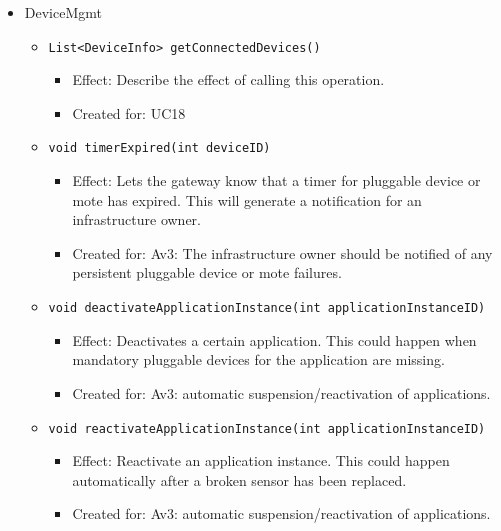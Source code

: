 \begin{itemize}
            \item DeviceMgmt
            \begin{itemize}
                \item \texttt{List<DeviceInfo> getConnectedDevices()}
                \begin{itemize}
                    \item Effect: Describe the effect of calling this operation.
                    \item Created for: UC18
                \end{itemize}
                \item \texttt{void timerExpired(int deviceID)}
                \begin{itemize}
                    \item Effect: Lets the gateway know that a timer for pluggable device or mote has expired.
                                  This will generate a notification for an infrastructure owner.
                    \item Created for: Av3: The infrastructure owner should be notified of
                          any persistent pluggable device or mote failures.
                \end{itemize}
                \item \texttt{void deactivateApplicationInstance(int applicationInstanceID)}
                \begin{itemize}
                    \item Effect: Deactivates a certain application. This could happen when
                                  mandatory pluggable devices for the application are missing.
                    \item Created for: Av3: automatic suspension/reactivation of applications.
                \end{itemize}
                \item \texttt{void reactivateApplicationInstance(int applicationInstanceID)}
                \begin{itemize}
                    \item Effect: Reactivate an application instance. This could happen
                                  automatically after a broken sensor has been replaced.
                    \item Created for: Av3: automatic suspension/reactivation of applications.
                \end{itemize}
            \end{itemize}


\end{itemize}

